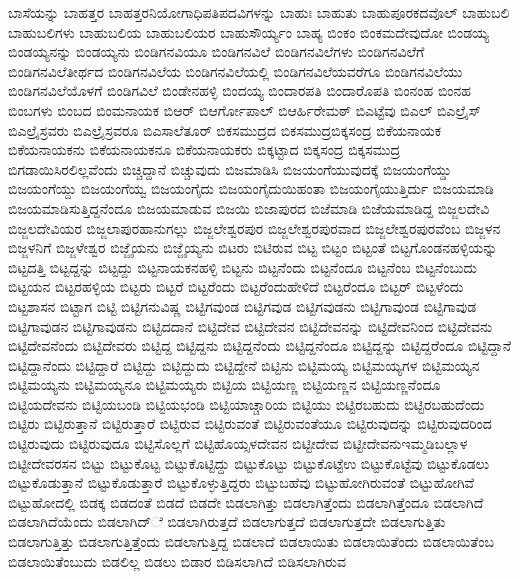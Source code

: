 {ಬಾಸೆಯನ್ನು
ಬಾಹತ್ತರ
ಬಾಹತ್ತರನಿಯೋಗಾಧಿಪತಿಪದವಿಗಳನ್ನು
ಬಾಹುಃ
ಬಾಹುತು
ಬಾಹುಪೂರಕದವೊಲ್
ಬಾಹುಬಲಿ
ಬಾಹುಬಲಿಗಳು
ಬಾಹುಬಲಿಯ
ಬಾಹುಬಲಿಯರ
ಬಾಹುಸೌರ್ಯ್ಯಂ
ಬಾಹ್ಯ
ಬಿಂಕಂ
ಬಿಂಕಮದೇವುದೋ
ಬಿಂಡಯ್ಯ
ಬಿಂಡಯ್ಯನನ್ನು
ಬಿಂಡಯ್ಯನು
ಬಿಂಡಿಗನವಿಯೂ
ಬಿಂಡಿಗನವಿಲೆ
ಬಿಂಡಿಗನವಿಲೆಗಳು
ಬಿಂಡಿಗನವಿಲೆಗೆ
ಬಿಂಡಿಗನವಿಲೆತೀರ್ಥದ
ಬಿಂಡಿಗನವಿಲೆಯ
ಬಿಂಡಿಗನವಿಲೆಯಲ್ಲಿ
ಬಿಂಡಿಗನವಿಲೆಯವರೆಗೂ
ಬಿಂಡಿಗನವಿಲೆಯು
ಬಿಂಡಿಗನವಿಲೆಯೊಳಗೆ
ಬಿಂಡಿಗವಿಲೆ
ಬಿಂಡೇನಹಳ್ಳಿ
ಬಿಂದಯ್ಯ
ಬಿಂದಾರಪತಿ
ಬಿಂದಾರೊಪತಿ
ಬಿಂನಂಹ
ಬಿಂನಹ
ಬಿಂಬಗಳು
ಬಿಂಬದ
ಬಿಂಮನಾಯಕ
ಬಿಆರ್
ಬಿಆರ್ಗೋಪಾಲ್
ಬಿಆರ್ಹಿರೇಮಠ್
ಬಿಎಟ್ಟೆವು
ಬಿಎಲ್
ಬಿಎಲ್ರೈಸ್
ಬಿಎಲ್ರೈಸ್ರವರು
ಬಿಎಲ್ರೈಸ್ರವರೂ
ಬಿಎಸಾಲೆತೂರ್
ಬಿಕಸಮುದ್ರದ
ಬಿಕಸಮುದ್ರಬಿಕ್ಕಸಂದ್ರ
ಬಿಕೆಯನಾಯಕ
ಬಿಕೆಯನಾಯಕನು
ಬಿಕೆಯನಾಯಕನೂ
ಬಿಕೆಯನಾಯಕರು
ಬಿಕ್ಕಟ್ಟಾದ
ಬಿಕ್ಕಸಂದ್ರ
ಬಿಕ್ಕಸಮುದ್ರ
ಬಿಗಡಾಯಿಸಿರಲಿಲ್ಲವೆಂದು
ಬಿಚ್ಚಿದ್ದಾನೆ
ಬಿಚ್ಚುವುದು
ಬಿಜಮಾಡಿಸಿ
ಬಿಜಯಂಗೆಯುವುದಕ್ಕೆ
ಬಿಜಯಂಗೆಯ್ಡು
ಬಿಜಯಂಗೆಯ್ದು
ಬಿಜಯಂಗೆಯ್ವ
ಬಿಜಯಂಗೈದು
ಬಿಜಯಂಗೈದುಯಿಹಂತಾ
ಬಿಜಯಂಗೈಯುತ್ತಿರ್ದು
ಬಿಜಯಮಾಡಿ
ಬಿಜಯಮಾಡಿಸುತ್ತಿದ್ದನೆಂದೂ
ಬಿಜಯಮಾಡುವ
ಬಿಜಯಿ
ಬಿಜಾಪುರದ
ಬಿಜೆಮಾಡಿ
ಬಿಜೆಯಮಾಡಿದ್ದ
ಬಿಜ್ಜಲದೇವಿ
ಬಿಜ್ಜಲದೇವಿಯರ
ಬಿಜ್ಜಲಾಪುರಹಾನುಗಲ್ಲು
ಬಿಜ್ಜಲೇಶ್ವರಪುರ
ಬಿಜ್ಜಲೇಶ್ವರಪುರವಾದ
ಬಿಜ್ಜಲೇಶ್ವರಪುರವೆಂಬ
ಬಿಜ್ಜಳನ
ಬಿಜ್ಜಳನಿಗೆ
ಬಿಜ್ಜಳೇಶ್ವರ
ಬಿಜ್ಜೈಯನು
ಬಿಜ್ಜೈಯ್ಯನು
ಬಿಟರು
ಬಿಟಿರುವ
ಬಿಟ್ಟ
ಬಿಟ್ಟಂ
ಬಿಟ್ಟಂತೆ
ಬಿಟ್ಟಗೊಂಡನಹಳ್ಳಿಯನ್ನು
ಬಿಟ್ಟದತ್ತಿ
ಬಿಟ್ಟದ್ದನ್ನು
ಬಿಟ್ಟದ್ದು
ಬಿಟ್ಟನಾಯಕನಹಳ್ಳಿ
ಬಿಟ್ಟನು
ಬಿಟ್ಟನೆಂದು
ಬಿಟ್ಟನೆಂದೂ
ಬಿಟ್ಟನೆಂಬ
ಬಿಟ್ಟನೆಂಬುದು
ಬಿಟ್ಟಯನ
ಬಿಟ್ಟರಹಳ್ಳಿಯ
ಬಿಟ್ಟರು
ಬಿಟ್ಟರೆ
ಬಿಟ್ಟರೆಂದು
ಬಿಟ್ಟರೆಂದುಹೇಳಿದೆ
ಬಿಟ್ಟರೆಂದೂ
ಬಿಟ್ಟರ್
ಬಿಟ್ಟಳೆಂದು
ಬಿಟ್ಟಶಾಸನ
ಬಿಟ್ಟಾಗ
ಬಿಟ್ಟಿ
ಬಿಟ್ಟಿಗನುವಿಷ್ಣ
ಬಿಟ್ಟಿಗವುಂಡ
ಬಿಟ್ಟಿಗವುಡ
ಬಿಟ್ಟಿಗವುಡನು
ಬಿಟ್ಟಿಗಾವುಂಡ
ಬಿಟ್ಟಿಗಾವುಡ
ಬಿಟ್ಟಿಗಾವುಡನ
ಬಿಟ್ಟಿಗಾವುಡನು
ಬಿಟ್ಟಿದದಾನೆ
ಬಿಟ್ಟಿದೇವ
ಬಿಟ್ಟಿದೇವನ
ಬಿಟ್ಟಿದೇವನನ್ನು
ಬಿಟ್ಟಿದೇವನಿಂದ
ಬಿಟ್ಟಿದೇವನು
ಬಿಟ್ಟಿದೇವನೆಂದು
ಬಿಟ್ಟಿದೇವರು
ಬಿಟ್ಟಿದ್ದ
ಬಿಟ್ಟಿದ್ದನು
ಬಿಟ್ಟಿದ್ದನೆಂದು
ಬಿಟ್ಟಿದ್ದನೆಂದೂ
ಬಿಟ್ಟಿದ್ದನ್ನು
ಬಿಟ್ಟಿದ್ದರೆಂದೂ
ಬಿಟ್ಟಿದ್ದಾನೆ
ಬಿಟ್ಟಿದ್ದಾನೆಂದು
ಬಿಟ್ಟಿದ್ದಾರೆ
ಬಿಟ್ಟಿದ್ದು
ಬಿಟ್ಟಿದ್ದುದು
ಬಿಟ್ಟಿದ್ದೇನೆ
ಬಿಟ್ಟಿನು
ಬಿಟ್ಟಿಮಯ್ಯ
ಬಿಟ್ಟಿಮಯ್ಯಗಳ
ಬಿಟ್ಟಿಮಯ್ಯನ
ಬಿಟ್ಟಿಮಯ್ಯನು
ಬಿಟ್ಟಿಮಯ್ಯನೂ
ಬಿಟ್ಟಿಮಯ್ಯರು
ಬಿಟ್ಟಿಯ
ಬಿಟ್ಟಿಯಣ್ಣ
ಬಿಟ್ಟಿಯಣ್ಣನ
ಬಿಟ್ಟಿಯಣ್ಣನೆಂದೂ
ಬಿಟ್ಟಿಯದೇವನು
ಬಿಟ್ಟಿಯಬಂಡಿ
ಬಿಟ್ಟಿಯಭಂಡಿ
ಬಿಟ್ಟಿಯಾಚ್ಚಾರಿಯ
ಬಿಟ್ಟಿಯು
ಬಿಟ್ಟಿರಬಹುದು
ಬಿಟ್ಟಿರಬಹುದೆಂದು
ಬಿಟ್ಟಿರು
ಬಿಟ್ಟಿರುತ್ತಾನೆ
ಬಿಟ್ಟಿರುತ್ತಾರೆ
ಬಿಟ್ಟಿರುವ
ಬಿಟ್ಟಿರುವಂತೆ
ಬಿಟ್ಟಿರುವಂತೆಯೂ
ಬಿಟ್ಟಿರುವುದನ್ನು
ಬಿಟ್ಟಿರುವುದರಿಂದ
ಬಿಟ್ಟಿರುವುದು
ಬಿಟ್ಟಿರುವುದೂ
ಬಿಟ್ಟಿಸೊಲ್ಲಗೆ
ಬಿಟ್ಟಿಹೊಯ್ಸಳದೇವನ
ಬಿಟ್ಟೀದೇವ
ಬಿಟ್ಟೀದೇವನುಇಮ್ಮಡಿಬಲ್ಲಾಳ
ಬಿಟ್ಟೀದೇವರಸನ
ಬಿಟ್ಟು
ಬಿಟ್ಟುಕೊಟ್ಟ
ಬಿಟ್ಟುಕೊಟ್ಟಿದ್ದು
ಬಿಟ್ಟುಕೊಟ್ಟು
ಬಿಟ್ಟುಕೊಟ್ಟೆಉ
ಬಿಟ್ಟುಕೊಟ್ಟೆವು
ಬಿಟ್ಟುಕೊಡಲು
ಬಿಟ್ಟುಕೊಡುತ್ತಾನೆ
ಬಿಟ್ಟುಕೊಡುತ್ತಾರೆ
ಬಿಟ್ಟುಕೊಳ್ಳುತ್ತಿದ್ದರು
ಬಿಟ್ಟುಬಹೆವು
ಬಿಟ್ಟುಹೋಗಿರುವಂತೆ
ಬಿಟ್ಟುಹೋಗಿವೆ
ಬಿಟ್ಟುಹೋದಲ್ಲಿ
ಬಿಡಕ್ಕ
ಬಿಡದಂತೆ
ಬಿಡದೆ
ಬಿಡದೇ
ಬಿಡಲಾಗಿತ್ತು
ಬಿಡಲಾಗಿತ್ತೆಂದು
ಬಿಡಲಾಗಿತ್ತೆಂದೂ
ಬಿಡಲಾಗಿದೆ
ಬಿಡಲಾಗಿದೆಯೆಂದು
ಬಿಡಲಾಗಿದ್ೆ
ಬಿಡಲಾಗಿರುತ್ತದೆ
ಬಿಡಲಾಗುತ್ತದೆ
ಬಿಡಲಾಗುತ್ತದೇ
ಬಿಡಲಾಗುತ್ತಿತು
ಬಿಡಲಾಗುತ್ತಿತ್ತು
ಬಿಡಲಾಗುತ್ತಿತ್ತೆಂದು
ಬಿಡಲಾಗುತ್ತಿದ್ದ
ಬಿಡಲಾದೆ
ಬಿಡಲಾಯಿತು
ಬಿಡಲಾಯಿತೆಂದು
ಬಿಡಲಾಯಿತೆಂಬ
ಬಿಡಲಾಯಿತೆಂಬುದು
ಬಿಡಲಿಲ್ಲ
ಬಿಡಲು
ಬಿಡಾರ
ಬಿಡಿಸಲಾಗಿದೆ
ಬಿಡಿಸಲಾಗಿರುವ
}
